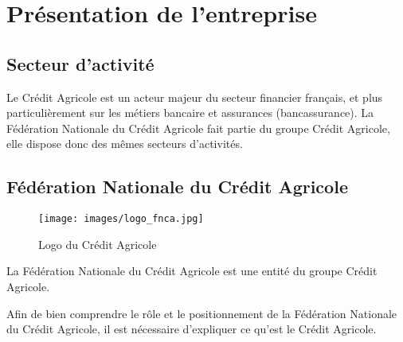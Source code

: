 \documentclass[12pt,a4paper]{article}
\begin{document}
\newpage

\section{Présentation de l'entreprise}
\subsection{Secteur d'activité}
Le Crédit Agricole est un acteur majeur du secteur financier français, et plus particulièrement sur les métiers bancaire et assurances (bancassurance).
La Fédération Nationale du Crédit Agricole fait partie du groupe Crédit Agricole, elle dispose donc des mêmes secteurs d'activités.\par
\subsection{Fédération Nationale du Crédit Agricole}
\begin{figure}[h!]
\centering
\texttt{[image: images/logo\_fnca.jpg]}
\caption{\label{logo}Logo du Crédit Agricole} %
\end{figure}
La Fédération Nationale du Crédit Agricole est une entité du groupe Crédit Agricole.\par
Afin de bien comprendre le rôle et le positionnement de la Fédération Nationale du Crédit Agricole, il est nécessaire d'expliquer ce qu'est le Crédit Agricole.
\end{document}
